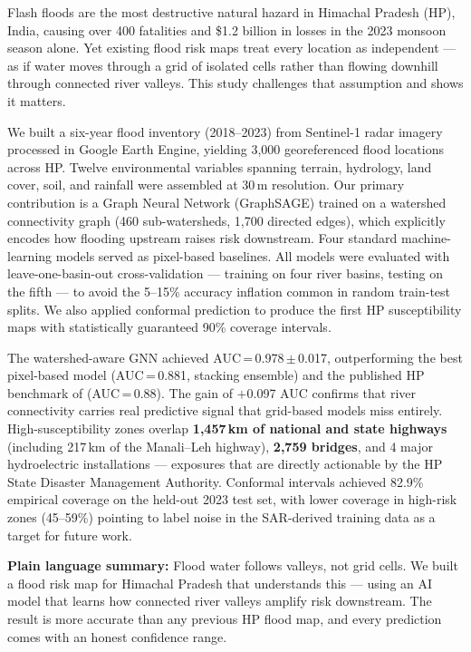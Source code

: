 Flash floods are the most destructive natural hazard in Himachal Pradesh (HP), India,
causing over 400 fatalities and \$1.2 billion in losses in the 2023 monsoon season alone.
Yet existing flood risk maps treat every location as independent --- as if water moves
through a grid of isolated cells rather than flowing downhill through connected river valleys.
This study challenges that assumption and shows it matters.

We built a six-year flood inventory (2018--2023) from Sentinel-1 radar imagery
processed in Google Earth Engine, yielding 3,000 georeferenced flood locations across HP.
Twelve environmental variables spanning terrain, hydrology, land cover, soil, and rainfall
were assembled at 30\,m resolution.
Our primary contribution is a Graph Neural Network (GraphSAGE) trained on a watershed
connectivity graph (460 sub-watersheds, 1,700 directed edges), which explicitly encodes
how flooding upstream raises risk downstream.
Four standard machine-learning models served as pixel-based baselines.
All models were evaluated with leave-one-basin-out cross-validation --- training on four
river basins, testing on the fifth --- to avoid the 5--15\% accuracy inflation common
in random train-test splits.
We also applied conformal prediction to produce the first HP susceptibility maps
with statistically guaranteed 90\% coverage intervals.

The watershed-aware GNN achieved AUC\,=\,0.978\,$\pm$\,0.017, outperforming the best
pixel-based model (AUC\,=\,0.881, stacking ensemble) and the published HP benchmark of \citet{saha2023}
(AUC\,=\,0.88).
The gain of $+$0.097 AUC confirms that river connectivity carries real predictive signal
that grid-based models miss entirely.
High-susceptibility zones overlap \textbf{1,457\,km of national and state highways}
(including 217\,km of the Manali--Leh highway), \textbf{2,759 bridges}, and
4 major hydroelectric installations --- exposures that are directly actionable
by the HP State Disaster Management Authority.
Conformal intervals achieved 82.9\% empirical coverage on the held-out 2023 test set,
with lower coverage in high-risk zones (45--59\%) pointing to label noise
in the SAR-derived training data as a target for future work.

\noindent\textbf{Plain language summary:}
Flood water follows valleys, not grid cells.
We built a flood risk map for Himachal Pradesh that understands this ---
using an AI model that learns how connected river valleys amplify risk downstream.
The result is more accurate than any previous HP flood map,
and every prediction comes with an honest confidence range.
